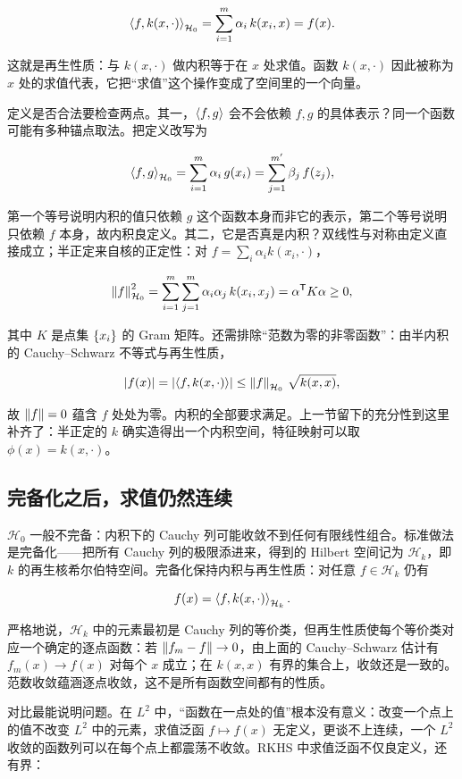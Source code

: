 \[
\left\langle f,k(x,\cdot)\right\rangle_{\mathcal{H}_0}
=\sum_{i=1}^{m}\alpha_i\,k(x_i,x)
=f(x).
\]

这就是再生性质：与 \(k(x,\cdot)\) 做内积等于在 \(x\) 处求值。函数 \(k(x,\cdot)\) 因此被称为 \(x\) 处的求值代表，它把``求值''这个操作变成了空间里的一个向量。

定义是否合法要检查两点。其一，\(\left\langle f,g\right\rangle\) 会不会依赖 \(f,g\) 的具体表示？同一个函数可能有多种锚点取法。把定义改写为

\[
\left\langle f,g\right\rangle_{\mathcal{H}_0}
=\sum_{i=1}^{m}\alpha_i\,g(x_i)
=\sum_{j=1}^{m'}\beta_j\,f(z_j),
\]

第一个等号说明内积的值只依赖 \(g\) 这个函数本身而非它的表示，第二个等号说明只依赖 \(f\) 本身，故内积良定义。其二，它是否真是内积？双线性与对称由定义直接成立；半正定来自核的正定性：对 \(f=\sum_i\alpha_i k(x_i,\cdot)\)，

\[
\left\lVert f\right\rVert_{\mathcal{H}_0}^{2}
=\sum_{i=1}^{m}\sum_{j=1}^{m}\alpha_i\alpha_j\,k(x_i,x_j)
=\alpha^{\mathsf{T}}K\alpha\ge0,
\]

其中 \(K\) 是点集 \(\left\{x_i\right\}\) 的 Gram 矩阵。还需排除``范数为零的非零函数''：由半内积的 Cauchy--Schwarz 不等式与再生性质，

\[
\left|f(x)\right|
=\left|\left\langle f,k(x,\cdot)\right\rangle\right|
\le\left\lVert f\right\rVert_{\mathcal{H}_0}\,\sqrt{k(x,x)},
\]

故 \(\left\lVert f\right\rVert=0\) 蕴含 \(f\) 处处为零。内积的全部要求满足。上一节留下的充分性到这里补齐了：半正定的 \(k\) 确实造得出一个内积空间，特征映射可以取 \(\phi(x)=k(x,\cdot)\)。

\subsection{完备化之后，求值仍然连续}

\(\mathcal{H}_0\) 一般不完备：内积下的 Cauchy 列可能收敛不到任何有限线性组合。标准做法是完备化——把所有 Cauchy 列的极限添进来，得到的 Hilbert 空间记为 \(\mathcal{H}_k\)，即 \(k\) 的再生核希尔伯特空间。完备化保持内积与再生性质：对任意 \(f\in\mathcal{H}_k\) 仍有

\[
f(x)=\left\langle f,k(x,\cdot)\right\rangle_{\mathcal{H}_k}.
\]

严格地说，\(\mathcal{H}_k\) 中的元素最初是 Cauchy 列的等价类，但再生性质使每个等价类对应一个确定的逐点函数：若 \(\left\lVert f_m-f\right\rVert\to0\)，由上面的 Cauchy--Schwarz 估计有 \(f_m(x)\to f(x)\) 对每个 \(x\) 成立；在 \(k(x,x)\) 有界的集合上，收敛还是一致的。范数收敛蕴涵逐点收敛，这不是所有函数空间都有的性质。

对比最能说明问题。在 \(L^2\) 中，``函数在一点处的值''根本没有意义：改变一个点上的值不改变 \(L^2\) 中的元素，求值泛函 \(f\mapsto f(x)\) 无定义，更谈不上连续，一个 \(L^2\) 收敛的函数列可以在每个点上都震荡不收敛。RKHS 中求值泛函不仅良定义，还有界：

